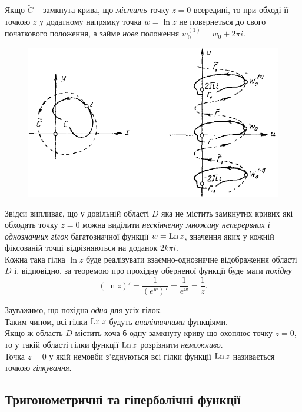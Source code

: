Якщо $\tilde{C}$ -- замкнута крива, що \textit{містить} точку $z = 0$ всередині, то при обході її точкою $z$ у додатному напрямку точка $w = \ln z$ не повернеться до свого початкового положення, а займе \textit{нове} положення $w_0^{(1)} = w_0 + 2 \pi i$.
\begin{figure}[H]
	\centering
	\includegraphics[width=.8\linewidth]{mal-14.png}
\end{figure}

Звідси випливає, що у довільній області $D$ яка не містить замкнутих кривих які обходять точку $z = 0$ можна виділити \textit{нескінченну множину неперервних і однозначних гілок} багатозначної функції $w = \operatorname{Ln} z$, значення яких у кожній фіксованій точці відрізняються на доданок $2 k \pi i$. \\

Кожна така гілка $\ln z$ буде реалізувати взаємно-однозначне відображення області $D$ і, відповідно, за теоремою про прохідну оберненої функції буде мати \textit{похідну}
\begin{equation}
	\label{eq:3.3.16}
	(\ln z)' = \dfrac{1}{(e^w)'} = \dfrac{1}{e^w} = \dfrac 1z.
\end{equation}

Зауважимо, що похідна \textit{одна} для усіх гілок. \\

Таким чином, всі гілки $\operatorname{Ln} z$ будуть \textit{аналітичними} функціями. \\

Якщо ж область $D$ містить хоча б одну замкнуту криву що охоплює точку $z = 0$, то у такій області гілки функції $\operatorname{Ln} z$ розрізнити \textit{неможливо}. \\

Точка $z = 0$ у якій немовби з'єднуються всі гілки функції $\operatorname{Ln} z$ називається точкою \textit{гілкування}.

\subsection{Тригонометричні та гіперболічні функції}

